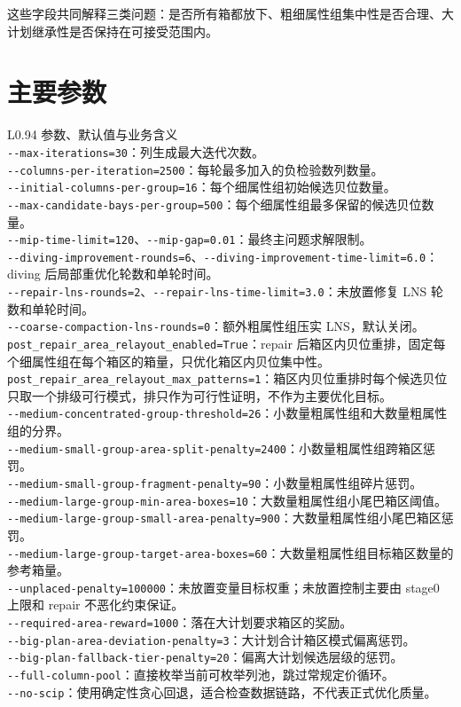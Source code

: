 \documentclass[UTF8,a4paper,11pt]{ctexart}
\newcommand{\code}[1]{\nolinkurl{#1}}
\begin{document}
这些字段共同解释三类问题：是否所有箱都放下、粗细属性组集中性是否合理、大计划继承性是否保持在可接受范围内。

\section{主要参数}

\begin{longtable}{L{0.94\linewidth}}
\toprule
参数、默认值与业务含义\\
\midrule
\code{--max-iterations=30}：列生成最大迭代次数。\\
\code{--columns-per-iteration=2500}：每轮最多加入的负检验数列数量。\\
\code{--initial-columns-per-group=16}：每个细属性组初始候选贝位数量。\\
\code{--max-candidate-bays-per-group=500}：每个细属性组最多保留的候选贝位数量。\\
\code{--mip-time-limit=120}、\code{--mip-gap=0.01}：最终主问题求解限制。\\
\code{--diving-improvement-rounds=6}、\code{--diving-improvement-time-limit=6.0}：diving 后局部重优化轮数和单轮时间。\\
\code{--repair-lns-rounds=2}、\code{--repair-lns-time-limit=3.0}：未放置修复 LNS 轮数和单轮时间。\\
\code{--coarse-compaction-lns-rounds=0}：额外粗属性组压实 LNS，默认关闭。\\
\code{post\_repair\_area\_relayout\_enabled=True}：repair 后箱区内贝位重排，固定每个细属性组在每个箱区的箱量，只优化箱区内贝位集中性。\\
\code{post\_repair\_area\_relayout\_max\_patterns=1}：箱区内贝位重排时每个候选贝位只取一个排级可行模式，排只作为可行性证明，不作为主要优化目标。\\
\code{--medium-concentrated-group-threshold=26}：小数量粗属性组和大数量粗属性组的分界。\\
\code{--medium-small-group-area-split-penalty=2400}：小数量粗属性组跨箱区惩罚。\\
\code{--medium-small-group-fragment-penalty=90}：小数量粗属性组碎片惩罚。\\
\code{--medium-large-group-min-area-boxes=10}：大数量粗属性组小尾巴箱区阈值。\\
\code{--medium-large-group-small-area-penalty=900}：大数量粗属性组小尾巴箱区惩罚。\\
\code{--medium-large-group-target-area-boxes=60}：大数量粗属性组目标箱区数量的参考箱量。\\
\code{--unplaced-penalty=100000}：未放置变量目标权重；未放置控制主要由 stage0 上限和 repair 不恶化约束保证。\\
\code{--required-area-reward=1000}：落在大计划要求箱区的奖励。\\
\code{--big-plan-area-deviation-penalty=3}：大计划合计箱区模式偏离惩罚。\\
\code{--big-plan-fallback-tier-penalty=20}：偏离大计划候选层级的惩罚。\\
\code{--full-column-pool}：直接枚举当前可枚举列池，跳过常规定价循环。\\
\code{--no-scip}：使用确定性贪心回退，适合检查数据链路，不代表正式优化质量。\\
\bottomrule
\end{longtable}
\end{document}
